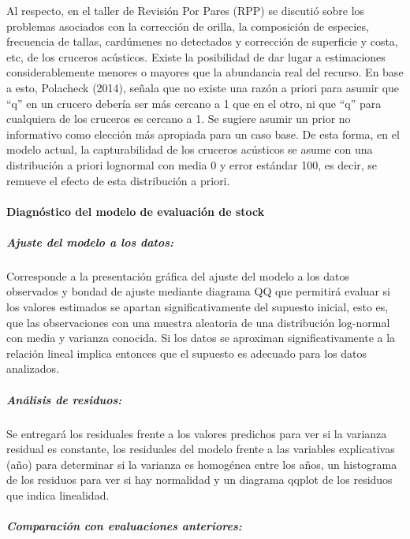 \documentclass[
  spanish,
]{article}
\begin{document}
Al respecto, en el taller de Revisión Por Pares (RPP) se discutió sobre
los problemas asociados con la corrección de orilla, la composición de
especies, frecuencia de tallas, cardúmenes no detectados y corrección de
superficie y costa, etc, de los cruceros acústicos. Existe la
posibilidad de dar lugar a estimaciones considerablemente menores o
mayores que la abundancia real del recurso. En base a esto, Polacheck
(2014), señala que no existe una razón a priori para asumir que ``q'' en
un crucero debería ser más cercano a 1 que en el otro, ni que ``q'' para
cualquiera de los cruceros es cercano a 1. Se sugiere asumir un prior no
informativo como elección más apropiada para un caso base. De esta
forma, en el modelo actual, la capturabilidad de los cruceros acústicos
se asume con una distribución a priori lognormal con media 0 y error
estándar 100, es decir, se remueve el efecto de esta distribución a
priori.

\hypertarget{diagnuxf3stico-del-modelo-de-evaluaciuxf3n-de-stock}{%
\paragraph{Diagnóstico del modelo de evaluación de
stock}\label{diagnuxf3stico-del-modelo-de-evaluaciuxf3n-de-stock}}

\hypertarget{ajuste-del-modelo-a-los-datos}{%
\subparagraph{Ajuste del modelo a los
datos:}\label{ajuste-del-modelo-a-los-datos}}

Corresponde a la presentación gráfica del ajuste del modelo a los datos
observados y bondad de ajuste mediante diagrama QQ que permitirá evaluar
si los valores estimados se apartan significativamente del supuesto
inicial, esto es, que las observaciones con una muestra aleatoria de una
distribución log-normal con media y varianza conocida. Si los datos se
aproximan significativamente a la relación lineal implica entonces que
el supuesto es adecuado para los datos analizados.

\hypertarget{anuxe1lisis-de-residuos}{%
\subparagraph{Análisis de residuos:}\label{anuxe1lisis-de-residuos}}

Se entregará los residuales frente a los valores predichos para ver si
la varianza residual es constante, los residuales del modelo frente a
las variables explicativas (año) para determinar si la varianza es
homogénea entre los años, un histograma de los residuos para ver si hay
normalidad y un diagrama qqplot de los residuos que indica linealidad.

\hypertarget{comparaciuxf3n-con-evaluaciones-anteriores}{%
\subparagraph{Comparación con evaluaciones
anteriores:}\label{comparaciuxf3n-con-evaluaciones-anteriores}}
\end{document}
